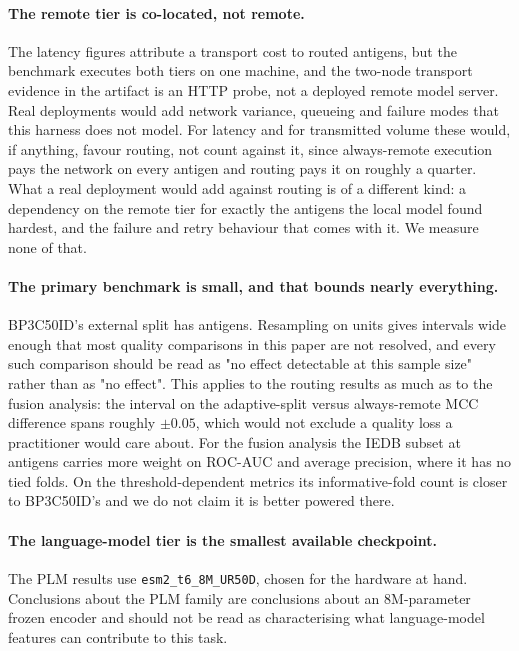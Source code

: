 \paragraph{The remote tier is co-located, not remote.} The latency figures
attribute a transport cost to routed antigens, but the benchmark executes both
tiers on one machine, and the two-node transport evidence in the artifact is an
HTTP probe, not a deployed remote model server. Real deployments would
add network variance, queueing and failure modes that
this harness does not model. For latency and for transmitted volume these
would, if anything, favour routing, not count against it, since
always-remote execution pays the network on every antigen and routing pays it
on roughly a quarter. What a real deployment would add against routing is of a
different kind: a dependency on the remote tier for exactly the antigens the
local model found hardest, and the failure and retry behaviour that comes with
it. We measure none of that.


\paragraph{The primary benchmark is small, and that bounds nearly everything.}
BP3C50ID's external split has \BepipredNumAntigens{} antigens. Resampling on
\BepipredNumAntigens{} units gives intervals wide enough that most quality
comparisons in this paper are not resolved, and every such comparison should be
read as "no effect detectable at this sample size" rather than as "no effect".
This applies to the routing results as much as to the fusion analysis: the
interval on the adaptive-split versus always-remote MCC difference spans roughly
$\pm 0.05$, which would not exclude a quality loss a practitioner would care
about. For the fusion analysis the IEDB subset at \NestedIedbSequences{}
antigens carries more weight on ROC-AUC and average precision, where it has no
tied folds. On the threshold-dependent metrics its informative-fold count is
closer to BP3C50ID's and we do not claim it is better powered there.

\paragraph{The language-model tier is the smallest available checkpoint.} The
PLM results use \texttt{esm2\_t6\_8M\_UR50D}, chosen for the hardware at hand.
Conclusions about the PLM family are conclusions about an 8M-parameter frozen
encoder and should not be read as characterising what language-model features
can contribute to this task.

